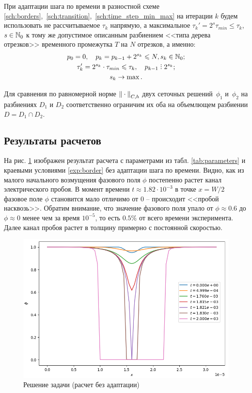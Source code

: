 При адаптации шага по времени в разностной схеме \eqref{sch:borders},~\eqref{sch:transition},~\eqref{sch:time_step_min_max} на итерации $k$ будем использовать не рассчитываемое $\tau_k$ напрямую, а максимальное $\tau_k' = 2^s \tau_{min} \leqslant \tau_k$, $s \in {\mathbb{N}}_0$ к тому же допустимое описанным разбиением <<типа дерева отрезков>> временного промежутка $T$ на $N$ отрезков, а именно:
\begin{gather*}
	p_0 = 0, \quad p_k = p_{k - 1} + 2^{s_k} \leqslant N, s_k \in \Natural_0; \\
	\tau_k' = 2^{s_k} \cdot \tau_{min} \leqslant \tau_k, \quad p_{k - 1} \divby 2^{s_k}; \\
	s_k \to \max.
\end{gather*}

Для сравнения по равномерной норме ${\| \cdot \|}_{C, h}$ двух сеточных решений~$\phi_1$ и~$\phi_2$ на разбиениях $D_1$ и $D_2$ соответственно ограничим их оба на объемлющем разбиении $D = D_1 \cap D_2$.


\subsection{Результаты расчетов}

На рис. \ref{fig:solution_basic} изображен результат расчета с параметрами из табл. \ref{tab:parameters} и краевыми условиями \eqref{exp:border} без адаптации шага по времени. Видно, как из малого начального возмущения фазового поля $\phi$ постепенно растет канал электрического пробоя. В момент времени $t \approx 1.82 \cdot 10^{-3}$ в точке $x = W / 2$ фазовое поле $\phi$  становится мало отличимо от $0$ -- происходит <<пробой насквозь>>. Обратим внимание, что значение фазового поля упало от $\phi \approx 0.6$ до $\phi \approx 0$ менее чем за время $10^{-5}$, то есть $0.5 \%$ от всего времени эксперимента. Далее канал пробоя растет в толщину примерно с постоянной скоростью.

\begin{figure}[!t]
	\centering
	\includegraphics[width=\textwidth]{figures/solution_basic.png}
	\vspace{-0.8cm}
	\caption{Решение задачи (расчет без адаптации)}
	\label{fig:solution_basic}
\end{figure}